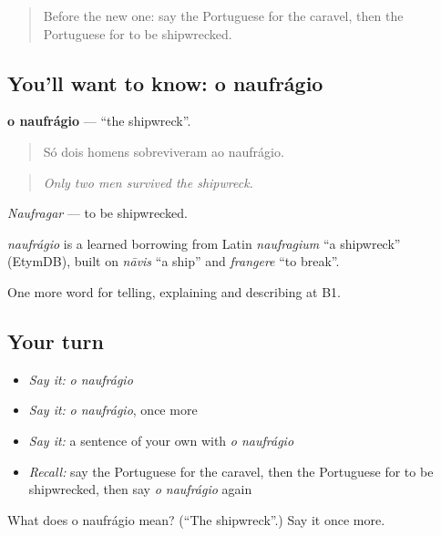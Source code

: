 \begin{quote}
Before the new one: say the Portuguese for the caravel, then the Portuguese for to be shipwrecked.
\end{quote}

\subsection*{You'll want to know: o naufrágio}
\textbf{o naufrágio} — \textquotedblleft{}the shipwreck\textquotedblright{}.

\begin{quote}
Só dois homens sobreviveram ao naufrágio.
\end{quote}

\begin{quote}
\emph{Only two men survived the shipwreck.}
\end{quote}

\emph{Naufragar} — to be shipwrecked.

\begin{cousinweb}
\emph{naufrágio} is a learned borrowing from Latin \emph{naufragium} \textquotedblleft{}a shipwreck\textquotedblright{} (EtymDB), built on \emph{nāvis} \textquotedblleft{}a ship\textquotedblright{} and \emph{frangere} \textquotedblleft{}to break\textquotedblright{}.
\end{cousinweb}

\begin{grammarlens}[title={What you've built}]
One more word for telling, explaining and describing at B1.
\end{grammarlens}

\subsection*{Your turn}
\begin{itemize}
\raggedright
  \item \emph{Say it:} \emph{o naufrágio}
  \item \emph{Say it:} \emph{o naufrágio}, once more
  \item \emph{Say it:} a sentence of your own with \emph{o naufrágio}
  \item \emph{Recall:} say the Portuguese for the caravel, then the Portuguese for to be shipwrecked, then say \emph{o naufrágio} again
\end{itemize}

\begin{tcolorbox}[breakable,colback=teal!4,colframe=teal!35!black,title={Before you move on}]
What does o naufrágio mean? (\textquotedblleft{}The shipwreck\textquotedblright{}.) Say it once more.
\end{tcolorbox}
